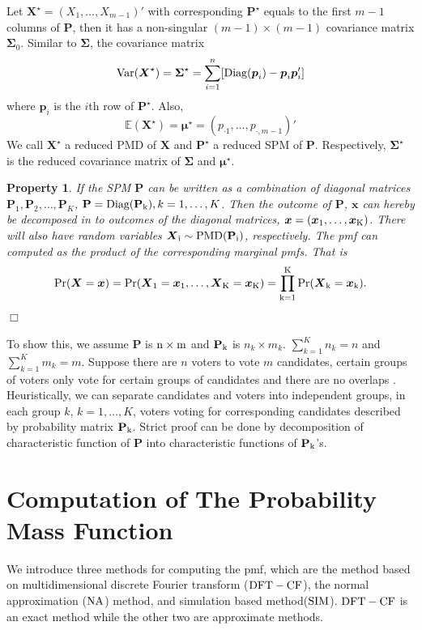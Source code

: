\documentclass[12pt]{article}
\newcommand{\EE}{\mathbb{E}}
\newcommand{\Pmat}{\mathbf{P}}
\newcommand{\pvec}{\boldsymbol{p}}
\newcommand{\Var}{{\rm Var}}
\newcommand{\diag}{\textrm{Diag}}
\newcommand{\PMD}{\textrm{PMD}}
\newcommand{\Xvec}{\boldsymbol{X}}
\newcommand{\xvec}{\boldsymbol{x}}
\newcommand{\Sig}{\boldsymbol{\Sigma}}
\newcommand{\mvec}{\boldsymbol{\mu}}
\newcommand{\SIM}{{\rm SIM}}
\newcommand{\NA}{{\rm NA}}
\newcommand{\dft}{{\rm DFT-CF}}
\newcommand{\qedw}{\hfill \ensuremath{\Box}}
\newtheorem{ppt}{Property}
\begin{document}
Let $\Xvec^{\star}=(X_1,\dots,X_{m-1})'$ with corresponding $\Pmat^{\star}$ equals to the first $m-1$ columns of $\Pmat$, then it has a non-singular $(m-1) \times (m-1)$ covariance matrix $\boldsymbol{\Sigma}_{0}$. Similar to $\Sig$, the covariance matrix
 $$\Var(\Xvec^{\star}) =\Sig^{\star}=\sum_{i=1}^n[\diag(\pvec_i)-\pvec_i\pvec_i']$$
where $\pvec_i$ is the $i$th row of $\Pmat^{\star}$. Also,  
  $$\EE(\Xvec^{\star}) =\boldsymbol{\mu^{\star}} = \left( p_{\cdot1} ,\dots,p_{\cdot,m-1}\right)'$$
 We call $\Xvec^{\star}$ a reduced $\PMD$ of $\Xvec$ and $\Pmat^{\star}$ a reduced SPM of $\Pmat$. Respectively, $\Sig^{\star}$ is the reduced covariance matrix of $\Sig$ and $\mvec^{\star}$.
\begin{ppt}\normalfont
If the SPM $\Pmat$ can be written as a combination of diagonal matrices $\Pmat_1, \Pmat_2, \dots, \Pmat_{K}$, $\Pmat = \diag(\Pmat_{\rm k}), k=1,\dots,K$. Then the outcome of $\Pmat$, $\boldsymbol{x}$ can hereby be decomposed in to outcomes of the diagonal matrices, $\xvec= (\xvec_{1},\dots,\xvec_{\rm K})$.  There will also have random variables $\Xvec_{\rm i} \sim \PMD(\Pmat_{\rm i})$, respectively. The pmf can computed as the product of the corresponding marginal pmfs. That is
\begin{align*}
\rm Pr(\Xvec=\xvec)= \rm \Pr(\Xvec_{1}=\xvec_{1}, \dots, \Xvec_{\rm K}=\xvec_{\rm K})= \prod_{k=1}^K \rm Pr(\Xvec_{k} = \xvec_{k}).
\end{align*}
\qedw
\end{ppt}

To show this, we assume $\Pmat$ is $\rm n \times m$ and $\Pmat_{\rm k}$ is $n_k \times m_k$. $\sum_{k=1}^K n_k = n$ and $\sum_{k=1}^K m_k = m$. Suppose there are $n$ voters to vote $m$ candidates, certain groups of voters only vote for certain groups of candidates and there are no overlaps . Heuristically, we can separate candidates and voters into independent groups, in each group $k$, $k = 1,\dots,K$, voters voting for corresponding candidates described by probability matrix $\Pmat_{\rm k}$. Strict proof can be done by decomposition of characteristic function of $\Pmat$ into characteristic functions of $\Pmat_{\rm k}$'s.



\section{Computation of The Probability Mass Function}\label{sec:CA.driving.study}
We introduce three methods for computing the pmf, which are the method based on multidimensional discrete Fourier transform ($\dft$), the normal approximation ($\NA$) method, and simulation based method($\SIM$). $\dft$ is an exact method while the other two are approximate methods.
\end{document}
